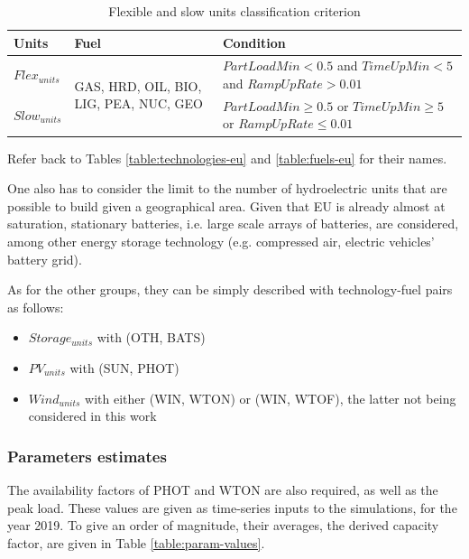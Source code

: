 \begin{table}[h!]
    \centering
	\begin{tabular}{|l | l | p{8cm}|}
		\hline
		Units & Fuel & Condition \\
		\hline
		$Flex_{units}$ & \multirow{2}{3cm}{GAS, HRD, OIL, BIO, LIG, PEA, NUC, GEO} & $PartLoadMin<0.5$ and $TimeUpMin<5$ and $RampUpRate>0.01$\\ \cline{1-1} \cline{3-3}
		$Slow_{units}$ &  & $PartLoadMin\geq 0.5$ or $TimeUpMin \geq 5$ or $RampUpRate\leq 0.01$\\
		\hline
	\end{tabular}
	\caption{Flexible and slow units classification criterion}
	\label{table:flex-vs-slow-unit}
\end{table}

Refer back to Tables \ref{table:technologies-eu} and \ref{table:fuels-eu} for their names.

One also has to consider the limit to the number of hydroelectric units that are possible to build given a geographical area. Given that EU is already almost at saturation, stationary batteries, i.e. large scale arrays of batteries, are considered, among other energy storage technology (e.g. compressed air, electric vehicles' battery grid).

As for the other groups, they can be simply described with technology-fuel pairs as follows:
\begin{itemize}
    \item $Storage_{units}$ with (OTH, BATS)
    \item $PV_{units}$ with (SUN, PHOT)
    \item $Wind_{units}$ with either (WIN, WTON) or (WIN, WTOF), the latter not being considered in this work
\end{itemize}

\subsubsection{Parameters estimates}

The availability factors of PHOT and WTON are also required, as well as the peak load. These values are given as time-series inputs to the simulations, for the year 2019. To give an order of magnitude, their averages, the derived capacity factor, are given in Table \ref{table:param-values}.


